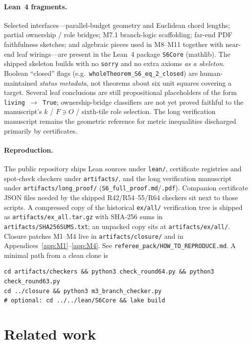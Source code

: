 \documentclass[11pt,reqno]{amsart}
\theoremstyle{definition}
\begin{document}
\paragraph{Lean~4 fragments.}
Selected interfaces---parallel-budget geometry and Euclidean chord lengths;
partial ownership / role bridges; M7.1 branch-logic scaffolding; far-end PDF
faithfulness sketches; and algebraic pieces used in M8--M11 together with
near-end leaf wirings---are present in the Lean~4 package \texttt{S6Core}
(mathlib).  The shipped skeleton builds with no \texttt{sorry} and no extra
axioms \emph{as a skeleton}.  Boolean ``closed'' flags
(e.g.\ \texttt{wholeTheorem\_S6\_eq\_2\_closed}) are human-maintained
\emph{status metadata}, not theorems about six unit squares covering a target.
Several leaf conclusions are still propositional placeholders of the form
\texttt{living $\to$ True}; ownership-bridge classifiers are not yet proved
faithful to the manuscript's $k$ / $F\ni O$ / sixth-tile role selection.
The long verification manuscript remains the geometric reference for metric
inequalities discharged primarily by certificates.

\paragraph{Reproduction.}
The public repository ships Lean sources under \texttt{lean/}, certificate
registries and spot-check checkers under \texttt{artifacts/}, and the long
verification manuscript under \texttt{artifacts/long\_proof/}
(\texttt{S6\_full\_proof.md}/\texttt{.pdf}).  Companion certificate JSON files
needed by the shipped R42/R54--55/R64 checkers sit next to those scripts.
A compressed copy of the historical \texttt{ex/all/} verification tree is
shipped as \texttt{artifacts/ex\_all.tar.gz} with SHA-256 sums in
\texttt{artifacts/SHA256SUMS.txt}; an unpacked copy sits at
\texttt{artifacts/ex/all/}.  Closure patches M1--M4 live in
\texttt{artifacts/closure/} and in Appendices~\ref{app:M1}--\ref{app:M4}.
See \texttt{referee\_pack/HOW\_TO\_REPRODUCE.md}.  A minimal path from a clean
clone is
\begin{verbatim}
cd artifacts/checkers && python3 check_round64.py && python3 check_round63.py
cd ../closure && python3 m3_branch_checker.py
# optional: cd ../../lean/S6Core && lake build
\end{verbatim}

\section{Related work}\label{sec:related}
\end{document}
